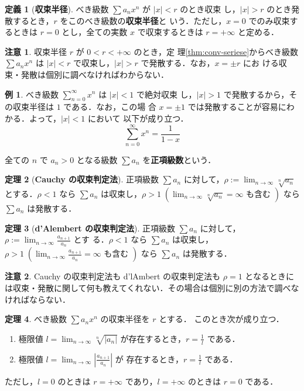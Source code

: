 \documentclass[10pt, uplatex, dvipdfmx]{jsarticle}
\theoremstyle{definition}
\newtheorem{theorem}{定理}[section]
\newtheorem*{definition}{定義}
\newtheorem{example}[theorem]{例}
\newtheorem*{remark}{注意}
\numberwithin{equation}{section}
\newcommand{\ds}{\displaystyle}
\begin{document}
\begin{definition}[\textbf{収束半径}]
  べき級数 $\sum a_n x^n$ が $|x| < r$ のとき収束
  し，$|x|>r$ のとき発散するとき，$r$ をこのべき級数の\textbf{収束半径}と
  いう．ただし，$x=0$ でのみ収束するときは $r=0$ とし，全ての実数 $x$
  で収束するときは $r=+\infty$ と定める．
\end{definition}


\begin{remark}
  収束半径 $r$ が $0 < r < +\infty$ のとき，定
  理\ref{thm:conv-seriese}からべき級数 $\sum  a_n
  x^n$ は $|x| <r$ で収束し，$|x|>r$ で発散する．なお，$x= \pm r$ にお
  ける収束・発散は個別に調べなければわからない．
\end{remark}


\begin{example}\label{exmp:geo}
  べき級数 $\ds \sum_{n=0}^{\infty} x^n$ は $|x|<1$ で絶対収束
  し，$|x|>1$ で発散するから，その収束半径は $1$ である．なお，この場
  合 $x=\pm1$ では発散することが容易にわかる．よって，$|x|<1$ において
  以下が成り立つ．
  \[
    \sum_{n=0}^{\infty}x^n=\frac{1}{1-x}
  \]
\end{example}

\newpage

全ての $n$ で $a_n>0$ となる級数 $\sum a_n$ を\textbf{正項級数}という．

\begin{theorem}[\textbf{Cauchy の収束判定法}]
  正項級数 $\sum a_n$ に対して，$\ds \rho := \lim_{n \to \infty}
  \sqrt[n]{a_n}$ とする．$\rho <1$ なら $\sum a_n$
  は収束し，$\ds \rho >1 \; \left( \lim_{n \to \infty} \sqrt[n]{a_n} =
    \infty \text{ も含む }\right)$ なら $\sum a_n$ は発散する．
\end{theorem}

\begin{theorem}[\textbf{d'Alembert の収束判定法}]
  正項級数 $\sum a_n$
  に対して，$\ds \rho:= \lim_{n \to \infty} \frac{a_{n+1}}{a_{n}}$ とす
  る．$\rho <1$ なら $\sum a_n$
  は収束し，$\ds \rho >1 \; \left( \lim_{n \to \infty} \frac{a_{n+1}}{a_n}
    = \infty \text{ も含む } \right)$ なら $\sum a_n$ は発散する．
\end{theorem}

\begin{remark}
  Cauchy の収束判定法も d'lAmbert の収束判定法も $\rho=1$ となるときに
  は収束・発散に関して何も教えてくれない．その場合は個別に別の方法で調べなければならない．
\end{remark}

\begin{theorem}\label{thm:criterion}
  べき級数 $ \sum a_n x^n$ の収束半径を $r$ とする．
  このとき次が成り立つ．
  \begin{enumerate}[(1)]
    \setlength{\itemsep}{1zh}
  \item 極限値 $\ds l = \lim_{n \to \infty} \sqrt[n]{|a_n|}$ が存在するとき，$\ds r=\frac{1}{l}$ である．
  \item 極限値
    $\ds l = \lim_{n \to \infty} \left| \frac{a_{n+1}}{a_n}\right|$ が
    存在するとき，$\ds r=\frac{1}{l}$ である．
  \end{enumerate}
  ただし，$l=0$ のときは $r=+\infty$ であり，$l=+\infty$ のときは $r=0$ である．
\end{theorem}
\end{document}
